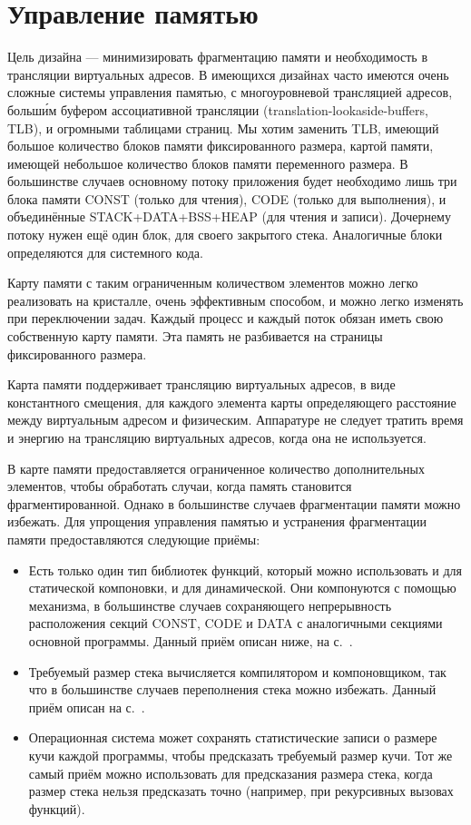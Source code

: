 \documentclass[forwardcom.tex]{subfiles}
\begin{document}
\section{Управление памятью} \label{memoryManagement}
Цель дизайна --- минимизировать фрагментацию памяти и необходимость в трансляции виртуальных адресов. В имеющихся дизайнах часто имеются очень сложные системы управления памятью, с многоуровневой трансляцией адресов, больш\'{и}м буфером ассоциативной трансляции (translation-lookaside-buffers, TLB), и огромными таблицами страниц. Мы хотим заменить TLB, имеющий большое количество блоков памяти фиксированного размера, картой памяти, имеющей небольшое количество блоков памяти переменного размера. В большинстве случаев основному потоку приложения будет необходимо лишь три блока памяти CONST (только для чтения), CODE (только для выполнения), и объединённые STACK+DATA+BSS+HEAP (для чтения и записи). Дочернему потоку нужен ещё один блок, для своего закрытого стека. Аналогичные блоки определяются для системного кода.

Карту памяти с таким ограниченным количеством элементов можно  легко реализовать на кристалле, очень эффективным способом, и можно легко изменять при переключении задач. Каждый процесс и каждый поток обязан иметь свою собственную карту памяти. Эта память не разбивается на страницы фиксированного размера. 

Карта памяти поддерживает трансляцию виртуальных адресов, в виде константного смещения, для каждого элемента карты определяющего расстояние между виртуальным адресом и физическим. Аппаратуре не следует тратить время и энергию на трансляцию виртуальных адресов, когда она не используется.

В карте памяти предоставляется ограниченное количество дополнительных элементов, чтобы обработать случаи, когда память становится фрагментированной. Однако в большинстве случаев фрагментации памяти можно избежать. Для упрощения управления памятью и устранения фрагментации памяти предоставляются следующие приёмы:
\begin{itemize}
\item Есть только один тип библиотек функций, который можно использовать и для статической компоновки, и для динамической. Они компонуются с помощью механизма, в большинстве случаев сохраняющего непрерывность расположения секций CONST, CODE и DATA с аналогичными секциями основной программы. Данный приём описан ниже, на с.~\pageref{libraryLinkMethods}.

\item Требуемый размер стека вычисляется компилятором и компоновщиком, так что в большинстве случаев переполнения стека можно избежать. Данный приём описан на с.~\pageref{predictingStackSize}.

\item Операционная система может сохранять статистические записи о размере кучи каждой программы, чтобы предсказать требуемый размер кучи. Тот же самый приём можно использовать для предсказания размера стека, когда размер стека нельзя предсказать точно (например, при рекурсивных вызовах функций). 
\end{itemize}
\end{document}
